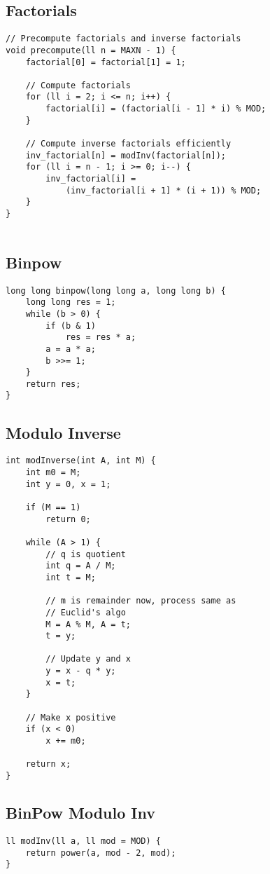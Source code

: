\documentclass[10pt]{article}
\begin{document}
\begin{multicols*}{2}
\subsection{Factorials}

\begin{lstlisting}[style=compactcpp]
// Precompute factorials and inverse factorials
void precompute(ll n = MAXN - 1) {
    factorial[0] = factorial[1] = 1;
    
    // Compute factorials
    for (ll i = 2; i <= n; i++) {
        factorial[i] = (factorial[i - 1] * i) % MOD;
    }
    
    // Compute inverse factorials efficiently
    inv_factorial[n] = modInv(factorial[n]);
    for (ll i = n - 1; i >= 0; i--) {
        inv_factorial[i] = 
            (inv_factorial[i + 1] * (i + 1)) % MOD;
    }
}
 
\end{lstlisting}

\subsection{Binpow}
\begin{lstlisting}[style=compactcpp]
long long binpow(long long a, long long b) {
    long long res = 1;
    while (b > 0) {
        if (b & 1)
            res = res * a;
        a = a * a;
        b >>= 1;
    }
    return res;
}
\end{lstlisting}
\subsection{Modulo Inverse}
\begin{lstlisting}[style=compactcpp]
int modInverse(int A, int M) {
    int m0 = M;
    int y = 0, x = 1;

    if (M == 1)
        return 0;

    while (A > 1) {
        // q is quotient
        int q = A / M;
        int t = M;

        // m is remainder now, process same as
        // Euclid's algo
        M = A % M, A = t;
        t = y;

        // Update y and x
        y = x - q * y;
        x = t;
    }

    // Make x positive
    if (x < 0)
        x += m0;

    return x;
}
\end{lstlisting}

\subsection{BinPow Modulo Inv}
\begin{lstlisting}[style=compactcpp]
ll modInv(ll a, ll mod = MOD) {
    return power(a, mod - 2, mod);
}


\end{lstlisting}
\end{multicols*}
\end{document}
